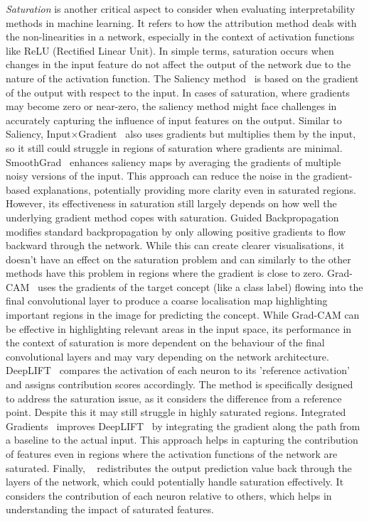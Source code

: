 \emph{Saturation} is another critical aspect to consider when evaluating interpretability methods in machine learning. It refers to how the attribution method deals with the non-linearities in a network, especially in the context of activation functions like ReLU (Rectified Linear Unit). In simple terms, saturation occurs when changes in the input feature do not affect the output of the network due to the nature of the activation function. The Saliency method~\cite{SimonyanVZ13} is based on the gradient of the output with respect to the input. In cases of saturation, where gradients may become zero or near-zero, the saliency method might face challenges in accurately capturing the influence of input features on the output. Similar to Saliency, Input$\times$Gradient~\cite{SimonyanVZ13} also uses gradients but multiplies them by the input, so it still could struggle in regions of saturation where gradients are minimal. SmoothGrad~\cite{SmilkovTKVW17} enhances saliency maps by averaging the gradients of multiple noisy versions of the input. This approach can reduce the noise in the gradient-based explanations, potentially providing more clarity even in saturated regions. However, its effectiveness in saturation still largely depends on how well the underlying gradient method copes with saturation. Guided Backpropagation~\cite{SpringenbergDBR14} modifies standard backpropagation by only allowing positive gradients to flow backward through the network. While this can create clearer visualisations, it doesn't have an effect on the saturation problem and can similarly to the other methods have this problem in regions where the gradient is close to zero. Grad-CAM~\cite{SelvarajuCDVPB20} uses the gradients of the target concept (like a class label) flowing into the final convolutional layer to produce a coarse localisation map highlighting important regions in the image for predicting the concept. While Grad-CAM can be effective in highlighting relevant areas in the input space, its performance in the context of saturation is more dependent on the behaviour of the final convolutional layers and may vary depending on the network architecture. DeepLIFT~\cite{ShrikumarGK17} compares the activation of each neuron to its 'reference activation' and assigns contribution scores accordingly. The method is specifically designed to address the saturation issue, as it considers the difference from a reference point. Despite this it may still struggle in highly saturated regions. Integrated Gradients~\cite{SundararajanTY17} improves DeepLIFT~\cite{ShrikumarGK17} by integrating the gradient along the path from a baseline to the actual input. This approach helps in capturing the contribution of features even in regions where the activation functions of the network are saturated. Finally, \LRP~\cite{bach2015pixel} redistributes the output prediction value back through the layers of the network, which could potentially handle saturation effectively. It considers the contribution of each neuron relative to others, which helps in understanding the impact of saturated features.


